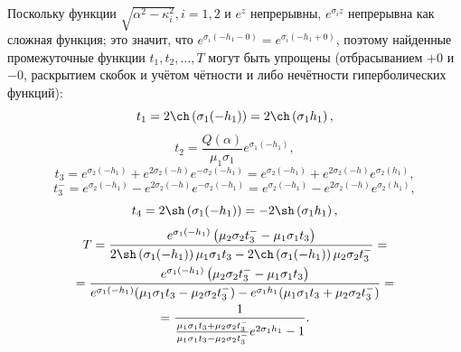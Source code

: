 \documentclass[a4paper, 12pt]{article}
\newcommand{\s}[1]{\sigma_{#1}}
\newcommand{\m}[1]{\mu_{#1}}
\newcommand{\E}[2]{e^{#1 #2}}
\begin{document}
Поскольку функции $\sqrt{\alpha^2-\kappa_i^2}, i=1, 2$ и $e^z$ непрерывны, $\E{\s{i}}{z}$ непрерывна как сложная функция;
это значит, что $\E{\s{i}}{(-h_1-0)}=\E{\s{i}}{(-h_1+0)}$, поэтому найденные промежуточные функции $t_1, t_2,\dots, T$ могут быть упрощены (отбрасыванием $+0$ и $-0$, раскрытием скобок и учётом чётности и либо нечётности гиперболических функций):
$$t_1=2\ch \left(\s{1} (-h_1) \right)=2\ch \left(\s{1} h_1 \right),$$
$$t_2=\frac{Q(\alpha)}{\m{1} \s{1}} \E{\s{1}}{(-h_1)},$$
$$t_3=\E{\s{2}}{(-h_1)}+ \E{2\s{2}}{(-h)} \E{-\s{2}}{(-h_1)}=\E{\s{2}}{(-h_1)}+ \E{2\s{2}}{(-h)} \E{\s{2}}{(h_1)},$$
$$t_3^-=\E{\s{2}}{(-h_1)}- \E{2\s{2}}{(-h)} \E{-\s{2}}{(-h_1)}=\E{\s{2}}{(-h_1)}- \E{2\s{2}}{(-h)} \E{\s{2}}{(h_1)},$$
$$t_4=2\sh \left( \s{1} (-h_1)\right)=-2\sh \left( \s{1} h_1\right),$$
\begin{multline}
    T=\frac{\E{\s{1}}{(-h_1)}\left( \m{2}\s{2}t_3^- - \m{1}\s{1}t_3\right)}{2\sh \left( \s{1} (-h_1)\right)\m{1}\s{1}t_3 - 2\ch \left( \s{1} (-h_1)\right)\m{2}\s{2}t_3^-}=\\
    =\frac{\E{\s{1}}{(-h_1)}\left( \m{2}\s{2}t_3^- - \m{1}\s{1}t_3\right)}{\E{\s{1}}{(-h_1)}(\m{1}\s{1}t_3-\m{2}\s{2}t_3^-)-\E{\s{1}}{h_1}(\m{1}\s{1}t_3+\m{2}\s{2}t_3^-)}=\\
    =\frac{1}{\frac{\m{1}\s{1}t_3+\m{2}\s{2}t_3^-}{\m{1}\s{1}t_3-\m{2}\s{2}t_3^-} e^{2\s{1}h_1}-1}.
\end{multline}
\end{document}
